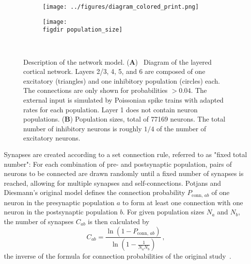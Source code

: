 \begin{figure}[tb]
    \centering 
    \begin{subfigure}[b]{0.6\textwidth} 
        \texttt{[image: ../figures/diagram\_colored\_print.png]}
        \label{fig:diagram}
    \end{subfigure}
    \begin{subfigure}[b]{0.35\textwidth}
        \texttt{[image: \\figdir population\_size]}
        \label{fig:population_size}
    \end{subfigure} ~
    \caption[Diagram of model and population sizes]{
        Description of the network model. 
        (\textbf{A})~%
        Diagram of the layered cortical network. 
        Layers 2/3, 4, 5, and 6 are composed of one excitatory
        (triangles) and one inhibitory population (circles) each.
        The connections are only shown for probabilities $>0.04$. 
        The external input is simulated by Poissonian spike trains
        with adapted rates for each population. 
        Layer 1 does not contain neuron populations.
        (\textbf{B})
        Population sizes, total of 77169 neurons. The total number of inhibitory neurons is roughly
        $1 / 4$ of the number of excitatory neurons. 
    }
    \label{fig:model_description} 
\end{figure}
Synapses are created according to a set connection rule, referred to as 
"fixed total number":
For each combination of pre- and postsynaptic population, pairs of neurons to be connected are drawn
randomly until a fixed number of synapses is reached, 
allowing for multiple synapses and self-connections. 
Potjans and Diesmann's original model defines the connection probability $P_{\text{conn}, \,ab}$ 
of one neuron in the presynaptic population $a$ to form at least one connection with one neuron in 
the postsynaptic population $b$. For given population sizes $N_a$ and $N_b$, the number of 
synapses $C_{ab}$ is then calculated by
\begin{equation}
    C_{ab} = \frac{\ln \left( 1 - P_{\text{conn}, \,ab} \right)}{\ln \left( 1 - \frac{1}{N_a N_b} \right)} \, ,
    \label{eq:synapse_numbers}
\end{equation}
the inverse of the formula for connection probabilities of the original study~\cite{potjans2014}.

